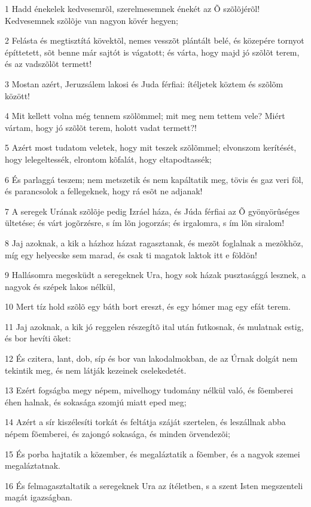 \par 1 Hadd énekelek kedvesemrõl, szerelmesemnek énekét az Õ szõlõjérõl! Kedvesemnek szõlõje van nagyon kövér hegyen;
\par 2 Felásta és megtisztítá kövektõl, nemes vesszõt plántált belé, és közepére tornyot építtetett, sõt benne már sajtót is vágatott; és várta, hogy majd jó szõlõt terem, és az vadszõlõt termett!
\par 3 Mostan azért, Jeruzsálem lakosi és Juda férfiai: ítéljetek köztem és szõlõm között!
\par 4 Mit kellett volna még tennem szõlõmmel; mit meg nem tettem vele? Miért vártam, hogy jó szõlõt terem, holott vadat termett?!
\par 5 Azért most tudatom veletek, hogy mit teszek szõlõmmel; elvonszom kerítését, hogy lelegeltessék, elrontom kõfalát, hogy eltapodtassék;
\par 6 És parlaggá teszem; nem metszetik és nem kapáltatik meg, tövis és gaz veri föl, és parancsolok a fellegeknek, hogy rá esõt ne adjanak!
\par 7 A seregek Urának szõlõje pedig Izráel háza, és Júda férfiai az Õ gyönyörûséges ültetése; és várt jogõrzésre, s ím lõn jogorzás; és irgalomra, s ím lõn siralom!
\par 8 Jaj azoknak, a kik a házhoz házat ragasztanak, és mezõt foglalnak a mezõkhöz, míg egy helyecske sem marad, és csak ti magatok laktok itt e földön!
\par 9 Hallásomra megesküdt a seregeknek Ura, hogy sok házak pusztasággá lesznek, a nagyok és szépek lakos nélkül,
\par 10 Mert tíz hold szõlõ egy báth bort ereszt, és egy hómer mag egy efát terem.
\par 11 Jaj azoknak, a kik jó reggelen részegítõ ital után futkosnak, és mulatnak estig, és bor hevíti õket:
\par 12 És czitera, lant, dob, síp és bor van lakodalmokban, de az Úrnak dolgát nem tekintik meg, és nem látják kezeinek cselekedetét.
\par 13 Ezért fogságba megy népem, mivelhogy tudomány nélkül való, és fõemberei éhen halnak, és sokasága szomjú miatt eped meg;
\par 14 Azért a sír kiszélesíti torkát és feltátja száját szertelen, és leszállnak abba népem fõemberei, és zajongó sokasága, és minden örvendezõi;
\par 15 És porba hajtatik a közember, és megaláztatik a fõember, és a nagyok szemei megaláztatnak.
\par 16 És felmagasztaltatik a seregeknek Ura az ítéletben, s a szent Isten megszenteli magát igazságban.
